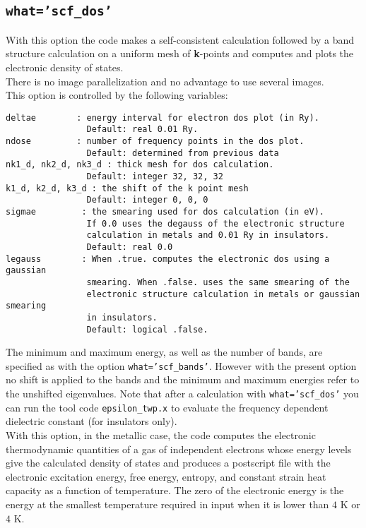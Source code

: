 \documentclass[12pt,a4paper]{article}
\begin{document}
\subsection{\color{web-blue}\texttt{what='scf\_dos'}}
With this option the code makes a self-consistent calculation followed
by a band structure calculation on a uniform mesh of {\bf k}-points and
computes and plots the electronic density of states. \\
There is no image parallelization and no advantage to use several images. \\
This option is controlled by the following variables:
\begin{verbatim} 
deltae        : energy interval for electron dos plot (in Ry).
                Default: real 0.01 Ry.
ndose         : number of frequency points in the dos plot.
                Default: determined from previous data
nk1_d, nk2_d, nk3_d : thick mesh for dos calculation.
                Default: integer 32, 32, 32
k1_d, k2_d, k3_d : the shift of the k point mesh
                Default: integer 0, 0, 0
sigmae         : the smearing used for dos calculation (in eV).
                If 0.0 uses the degauss of the electronic structure
                calculation in metals and 0.01 Ry in insulators.
                Default: real 0.0 
legauss        : When .true. computes the electronic dos using a gaussian
                smearing. When .false. uses the same smearing of the
                electronic structure calculation in metals or gaussian smearing
                in insulators.
                Default: logical .false.
\end{verbatim}
The minimum and maximum energy, as well as the number of bands,
are specified as with the option \texttt{what='scf\_bands'}.
However with the present option no shift is applied to the bands
and the minimum and maximum energies refer to the unshifted eigenvalues.
Note that after a calculation with \texttt{what='scf\_dos'} you can
run the tool code \texttt{epsilon\_twp.x} to evaluate the frequency
dependent dielectric constant (for insulators only). \\
With this option, in the metallic case, 
the code computes the electronic thermodynamic quantities of
a gas of independent electrons whose energy levels give the calculated 
density of states and produces a postscript file
with the electronic excitation energy, free energy, entropy,
and constant strain heat capacity as a function of temperature. 
The zero of the electronic energy is the energy at the smallest temperature 
required in input when it is lower than $4$ K or $4$ K. 
\end{document}
